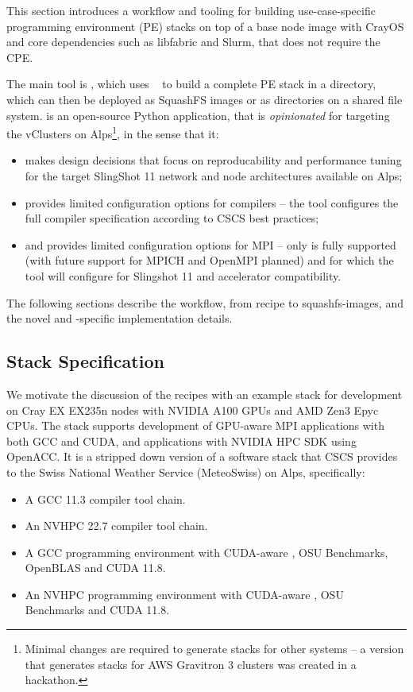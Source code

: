 This section introduces a workflow and tooling for building use-case-specific programming environment (PE) stacks on top of a base node image with CrayOS and core dependencies such as libfabric and Slurm, that does not require the CPE.

The main tool is \href{https://github.com/eth-cscs/stackinator}{\stackinator}, which uses \spack~\cite{gamblin:sc15} to build a complete PE stack in a directory, which can then be deployed as SquashFS images or as directories on a shared file system.
\stackinator is an open-source Python application, that is \emph{opinionated} for targeting the vClusters on Alps\footnote{Minimal changes are required to generate stacks for other systems -- a version that generates stacks for AWS Gravitron 3 clusters was created in a hackathon.}, in the sense that it:
\begin{itemize}
    \item makes design decisions that focus on reproducability and performance tuning for the target SlingShot 11 network and node architectures available on Alps;
    \item provides limited configuration options for compilers -- the tool configures the full compiler specification according to CSCS best practices;
    \item and provides limited configuration options for MPI -- only \craympich is fully supported (with future support for MPICH and OpenMPI planned) and for which the tool will configure for Slingshot 11 and accelerator compatibility.
\end{itemize}

The following sections describe the workflow, from recipe to squashfs-images, and the novel and \crayex-specific implementation details.

\subsection{Stack Specification}

We motivate the discussion of the \spack recipes with an example stack for development on Cray EX EX235n nodes with NVIDIA A100 GPUs and AMD Zen3 Epyc CPUs.
The stack supports development of GPU-aware MPI applications with both GCC and CUDA, and applications with NVIDIA HPC SDK using OpenACC.
It is a stripped down version of a software stack that CSCS provides to the Swiss National Weather Service (MeteoSwiss) on Alps, specifically:
\begin{itemize}
    \item A GCC 11.3 compiler tool chain.
    \item An NVHPC 22.7 compiler tool chain.
    \item A GCC programming environment  with CUDA-aware \craympich, OSU Benchmarks, OpenBLAS and CUDA 11.8.
    \item An NVHPC programming environment  with CUDA-aware \craympich, OSU Benchmarks and CUDA 11.8.
\end{itemize}

